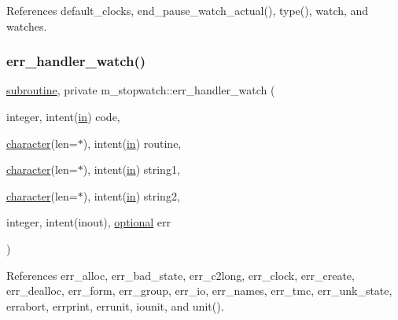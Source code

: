 References default\+\_\+clocks, end\+\_\+pause\+\_\+watch\+\_\+actual(), type(), watch, and watches.

\mbox{\label{namespacem__stopwatch_a8129c70e425409f9dc6666729f5b5c9c}} 
\subsubsection{\texorpdfstring{err\+\_\+handler\+\_\+watch()}{err\_handler\_watch()}}
{\footnotesize\ttfamily \hyperlink{M__stopwatch_83_8txt_acfbcff50169d691ff02d4a123ed70482}{subroutine}, private m\+\_\+stopwatch\+::err\+\_\+handler\+\_\+watch (\begin{DoxyParamCaption}\item[{integer, intent(\hyperlink{M__journal_83_8txt_afce72651d1eed785a2132bee863b2f38}{in})}]{code,  }\item[{\hyperlink{option__stopwatch_83_8txt_abd4b21fbbd175834027b5224bfe97e66}{character}(len=$\ast$), intent(\hyperlink{M__journal_83_8txt_afce72651d1eed785a2132bee863b2f38}{in})}]{routine,  }\item[{\hyperlink{option__stopwatch_83_8txt_abd4b21fbbd175834027b5224bfe97e66}{character}(len=$\ast$), intent(\hyperlink{M__journal_83_8txt_afce72651d1eed785a2132bee863b2f38}{in})}]{string1,  }\item[{\hyperlink{option__stopwatch_83_8txt_abd4b21fbbd175834027b5224bfe97e66}{character}(len=$\ast$), intent(\hyperlink{M__journal_83_8txt_afce72651d1eed785a2132bee863b2f38}{in})}]{string2,  }\item[{integer, intent(inout), \hyperlink{option__stopwatch_83_8txt_aa4ece75e7acf58a4843f70fe18c3ade5}{optional}}]{err }\end{DoxyParamCaption})\hspace{0.3cm}{\ttfamily [private]}}



References err\+\_\+alloc, err\+\_\+bad\+\_\+state, err\+\_\+c2long, err\+\_\+clock, err\+\_\+create, err\+\_\+dealloc, err\+\_\+form, err\+\_\+group, err\+\_\+io, err\+\_\+names, err\+\_\+tmc, err\+\_\+unk\+\_\+state, errabort, errprint, errunit, iounit, and unit().

\mbox{\label{namespacem__stopwatch_a5b5053a6d9b4a5c8395c25510fb99790}} 
